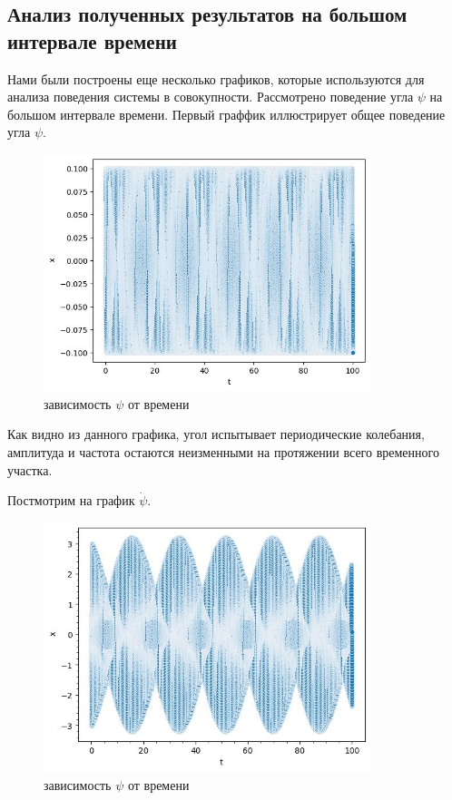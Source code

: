 \documentclass[a4paper, 12pt]{article}
\begin{document}
 \newpage
 \subsection{Анализ полученных результатов на большом интервале времени}
    Нами были построены еще несколько графиков, которые используются для анализа поведения системы в совокупности.
    Рассмотрено поведение угла $\psi$ на большом интервале времени.
    Первый граффик иллюстрирует общее поведение угла $\psi$.
    \begin{figure}[H]
        \centering
        \includegraphics[width = 0.85\textwidth, height = 0.20\textheight]{pictures/data/psi_big.jpg}
        \caption{зависимость $\psi$ от времени}
       \end{figure}
    Как видно из данного графика, угол испытывает периодические колебания, амплитуда и частота остаются неизменными на протяжении всего временного участка.
    
    Постмотрим на график $\dot{\psi}$.
    \begin{figure}[H]
        \centering
        \includegraphics[width = 0.85\textwidth, height = 0.20\textheight]{pictures/data/psi__big.jpg}
        \caption{зависимость $\psi$ от времени}
       \end{figure}
       
\end{document}
